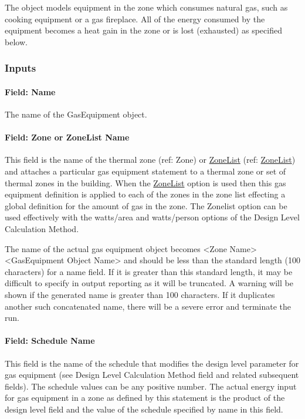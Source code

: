 The object models equipment in the zone which consumes natural gas, such as cooking equipment or a gas fireplace. All of the energy consumed by the equipment becomes a heat gain in the zone or is lost (exhausted) as specified below.

\subsubsection{Inputs}\label{inputs-4-017}

\paragraph{Field: Name}\label{field-name-4-014}

The name of the GasEquipment object.

\paragraph{Field: Zone or ZoneList Name}\label{field-zone-or-zonelist-name-3}

This field is the name of the thermal zone (ref: Zone) or \hyperref[zonelist]{ZoneList} (ref: \hyperref[zonelist]{ZoneList}) and attaches a particular gas equipment statement to a thermal zone or set of thermal zones in the building. When the \hyperref[zonelist]{ZoneList} option is used then this gas equipment definition is applied to each of the zones in the zone list effecting a global definition for the amount of gas in the zone. The Zonelist option can be used effectively with the watts/area and watts/person options of the Design Level Calculation Method.

The name of the actual gas equipment object becomes \textless{}Zone Name\textgreater{} \textless{}GasEquipment Object Name\textgreater{} and should be less than the standard length (100 characters) for a name field. If it is greater than this standard length, it may be difficult to specify in output reporting as it will be truncated. A warning will be shown if the generated name is greater than 100 characters. If it duplicates another such concatenated name, there will be a severe error and terminate the run.

\paragraph{Field: Schedule Name}\label{field-schedule-name-2-001}

This field is the name of the schedule that modifies the design level parameter for gas equipment (see Design Level Calculation Method field and related subsequent fields). The schedule values can be any positive number. The actual energy input for gas equipment in a zone as defined by this statement is the product of the design level field and the value of the schedule specified by name in this field.

